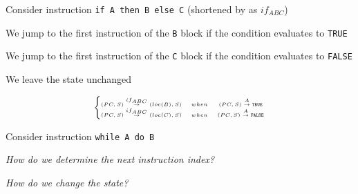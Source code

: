 \documentclass{beamer}
\begin{document}

\begin{slide}{
\item Consider instruction \texttt{if A then B else C} (shortened by as $if_{ABC}$)
\pause
\item We jump to the first instruction of the \texttt{B} block if the condition evaluates to \texttt{TRUE}
\pause
\item We jump to the first instruction of the \texttt{C} block if the condition evaluates to \texttt{FALSE}
\pause
\item We leave the state unchanged
\pause

$$
\tiny
\left\{
\begin{matrix}
(PC,S) \overset{if_{ABC}}{\rightarrow} (loc(B),S) &when& (PC,S) \overset{A}{\rightarrow} \mathtt{TRUE} \\
(PC,S) \overset{if_{ABC}}{\rightarrow} (loc(C),S) &when& (PC,S) \overset{A}{\rightarrow} \mathtt{FALSE} \\
\end{matrix}
\right.
$$

}\end{slide}

\begin{slide}{
\item Consider instruction \texttt{while A do B}
\item \textit{How do we determine the next instruction index?}
\item \textit{How do we change the state?}
}\end{slide}
\end{document}
